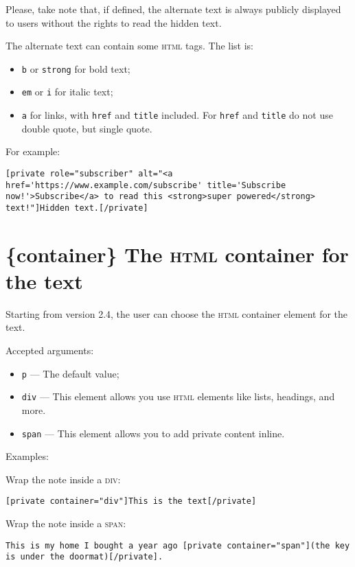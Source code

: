 Please, take note that, if defined, the alternate text is always publicly
displayed to users without the rights to read the hidden text.

The alternate text can contain some \textsc{html} tags. The list is:

\begin{itemize}
 \item \verb+b+ or \verb+strong+ for bold text;
 \item \verb+em+ or \verb+i+ for italic text;
 \item \verb+a+ for links, with \verb+href+ and \verb+title+ included. For
 \verb+href+ and \verb+title+ do not use double quote, but single quote.
\end{itemize}

For example:

\begin{lstlisting}
[private role="subscriber" alt="<a href='https://www.example.com/subscribe' title='Subscribe now!'>Subscribe</a> to read this <strong>super powered</strong> text!"]Hidden text.[/private]
\end{lstlisting}

\section{\{container\} The \textsc{html} container for the text}

Starting from version 2.4, the user can choose the \textsc{html} container
element for the text.

Accepted arguments:

\begin{itemize}
 \item \verb+p+ --- The default value;
 \item \verb+div+ --- This element allows you use \textsc{html} elements like
 lists, headings, and more.
 \item \verb+span+ --- This element allows you to add private content inline.
\end{itemize}

Examples:

Wrap the note inside a \textsc{div}:

\begin{lstlisting}
[private container="div"]This is the text[/private]
\end{lstlisting}

Wrap the note inside a \textsc{span}:

\begin{lstlisting}
This is my home I bought a year ago [private container="span"](the key is under the doormat)[/private].
\end{lstlisting}


